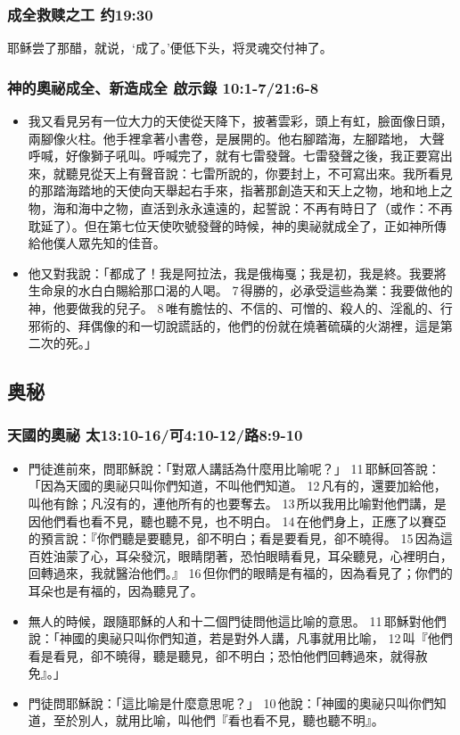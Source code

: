 \subsubsection{成全救赎之工 约19:30}
耶稣尝了那醋，就说，‘成了。’便低下头，将灵魂交付神了。

\subsubsection{神的奧祕成全、新造成全  啟示錄 10:1-7/21:6-8}
\begin{itemize}
\item 我又看見另有一位大力的天使從天降下，披著雲彩，頭上有虹，臉面像日頭，兩腳像火柱。他手裡拿著小書卷，是展開的。他右腳踏海，左腳踏地， 
大聲呼喊，好像獅子吼叫。呼喊完了，就有七雷發聲。七雷發聲之後，我正要寫出來，就聽見從天上有聲音說：七雷所說的，你要封上，不可寫出來。我所看見的那踏海踏地的天使向天舉起右手來，指著那創造天和天上之物，地和地上之物，海和海中之物，直活到永永遠遠的，起誓說：不再有時日了（或作：不再耽延了）。但在第七位天使吹號發聲的時候，神的奧祕就成全了，正如神所傳給他僕人眾先知的佳音。 
\item 他又對我說：「都成了！我是阿拉法，我是俄梅戛；我是初，我是終。我要將生命泉的水白白賜給那口渴的人喝。 7 得勝的，必承受這些為業：我要做他的神，他要做我的兒子。 8 唯有膽怯的、不信的、可憎的、殺人的、淫亂的、行邪術的、拜偶像的和一切說謊話的，他們的份就在燒著硫磺的火湖裡，這是第二次的死。」
\end{itemize}

\subsection{奥秘}
 


\subsubsection{天國的奧祕 太13:10-16/可4:10-12/路8:9-10}
\begin{itemize}
\item 門徒進前來，問耶穌說：「對眾人講話為什麼用比喻呢？」 11 耶穌回答說：「因為天國的奧祕只叫你們知道，不叫他們知道。 12 凡有的，還要加給他，叫他有餘；凡沒有的，連他所有的也要奪去。 13 所以我用比喻對他們講，是因他們看也看不見，聽也聽不見，也不明白。 14 在他們身上，正應了以賽亞的預言說：『你們聽是要聽見，卻不明白；看是要看見，卻不曉得。 15 因為這百姓油蒙了心，耳朵發沉，眼睛閉著，恐怕眼睛看見，耳朵聽見，心裡明白，回轉過來，我就醫治他們。』 16 但你們的眼睛是有福的，因為看見了；你們的耳朵也是有福的，因為聽見了。
\item 無人的時候，跟隨耶穌的人和十二個門徒問他這比喻的意思。 11 耶穌對他們說：「神國的奧祕只叫你們知道，若是對外人講，凡事就用比喻， 12 叫『他們看是看見，卻不曉得，聽是聽見，卻不明白；恐怕他們回轉過來，就得赦免』。」
\item 門徒問耶穌說：「這比喻是什麼意思呢？」 10 他說：「神國的奧祕只叫你們知道，至於別人，就用比喻，叫他們『看也看不見，聽也聽不明』。
\end{itemize}



